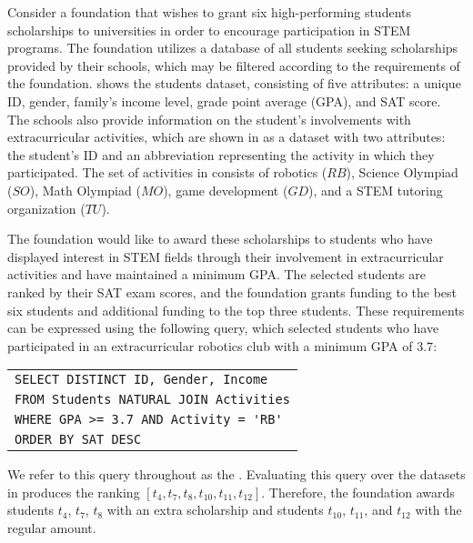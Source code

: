 \begin{example}
	\label{ex:running}
	Consider a foundation that wishes to grant six high-performing students scholarships to universities in order to encourage participation in STEM programs. 
 The foundation utilizes a database of all students seeking scholarships provided by their schools, which may be filtered according to the requirements of the foundation. 
  shows the students dataset, consisting of five attributes: a unique ID, gender, family's income level, grade point average (GPA), and SAT score. The schools also provide information on the student's 
 involvements with extracurricular activities, which are shown in  as a dataset with two attributes: the student's ID and an abbreviation representing the activity in which they participated. The set of activities in  consists of robotics ($RB$), Science Olympiad ($SO$), Math Olympiad ($MO$), game development ($GD$), and a STEM tutoring organization ($TU$).
 
    The foundation would like to award these scholarships to students who have displayed interest in STEM fields through their involvement in extracurricular activities and have maintained a minimum GPA. The selected students are ranked by their SAT exam scores, and the foundation grants funding to the best six students and additional funding to the top three students.
    These requirements can be expressed using the following query, which selected students who have participated in an extracurricular robotics club with a minimum GPA of $3.7$:
    
    \begin{center}
    \footnotesize
    \begin{tabular}{l}
        \verb"SELECT DISTINCT ID, Gender, Income "\\
        \verb"FROM Students NATURAL JOIN Activities"\\
        \verb"WHERE GPA >= 3.7 AND Activity = 'RB'"\\
        \verb"ORDER BY SAT DESC"\\
    \end{tabular}
    \end{center}
    We refer to this query throughout as the \running{}. Evaluating this query over the datasets in  produces the ranking $[t_4, t_7, t_8, t_{10}, t_{11}, t_{12}]$. %
    Therefore, the foundation awards students $t_4$, $t_7$, $t_8$ with an extra scholarship and students $t_{10}$, $t_{11}$, and $t_{12}$ with the regular amount.
\end{example}

